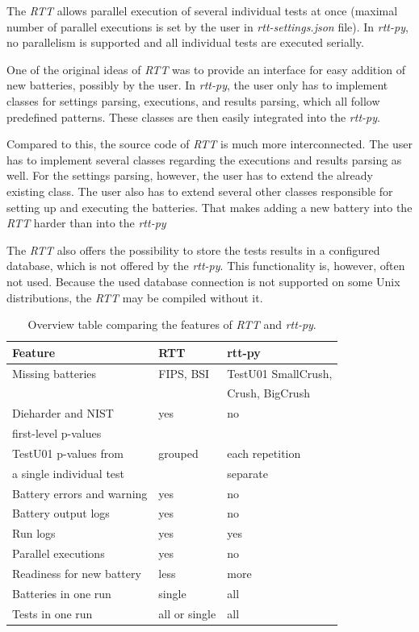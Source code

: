 \documentclass[
  digital,     %
  oneside,     %
  nosansbold,  %
  nocolorbold, %
  nolof,         %
  nolot,         %
]{fithesis4}
\begin{document}
The \emph{RTT} allows parallel execution of several individual tests at once (maximal number of parallel executions is set by the user in \emph{rtt-settings.json} file). In \emph{rtt-py}, no parallelism is supported and all individual tests are executed serially. 

One of the original ideas of \emph{RTT} was to provide an interface for easy addition of new batteries, possibly by the user. In \emph{rtt-py}, the user only has to implement classes for settings parsing, executions, and results parsing, which all follow predefined patterns. These classes are then easily integrated into the \emph{rtt-py}.

Compared to this, the source code of \emph{RTT} is much more interconnected. The user has to implement several classes regarding the executions and results parsing as well. For the settings parsing, however, the user has to extend the already existing class. The user also has to extend several other classes responsible for setting up and executing the batteries. That makes adding a new battery into the \emph{RTT} harder than into the \emph{rtt-py}

The \emph{RTT} also offers the possibility to store the tests results in a configured database, which is not offered by the \emph{rtt-py}. This functionality is, however, often not used. Because the used database connection is not supported on some Unix distributions, the \emph{RTT} may be compiled without it.

\begin{table}[t]
  \begin{tabularx}{\textwidth}{l|l|l}
    Feature & RTT & rtt-py \\
    \midrule
    \midrule
    Missing batteries & FIPS, BSI & TestU01 SmallCrush, \\ %
     & & Crush, BigCrush \\
    \midrule
    Dieharder and NIST & yes & no \\ %
     first-level p-values & & \\
    \midrule
    TestU01 p-values from  & grouped & each repetition \\
     a single individual test  & &  separate \\
    \midrule
    Battery errors and warning & yes & no \\ %
    \midrule
    Battery output logs & yes & no \\ %
    \midrule
    Run logs & yes & yes \\
    \midrule
    Parallel executions & yes & no \\ %
    \midrule
    Readiness for new battery & less & more \\
    \midrule
    Batteries in one run & single & all \\
    \midrule
    Tests in one run & all or single & all \\
  \end{tabularx}
  \caption{Overview table comparing the features of \emph{RTT} and \emph{rtt-py}.}
  \label{tab:comparison}
\end{table}
\end{document}
